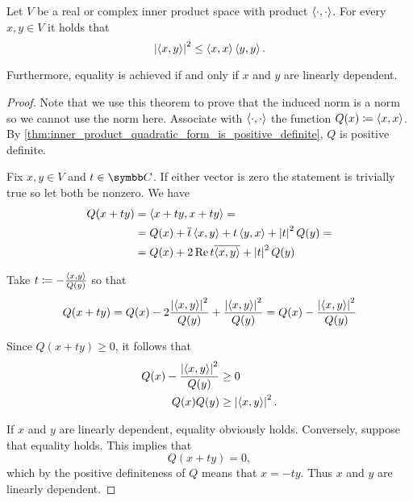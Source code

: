 \begin{theorem}\label{thm:cauchy_bunyakovsky_schwarz_inequality}
  Let \( V \) be a real or complex inner product space with product \( \left\langle \cdot, \cdot \right\rangle \). For every \( x, y \in V \) it holds that
  \begin{equation}\label{thm:cauchy_bunyakovsky_schwarz_inequality/inequality}
    {\left\vert \left\langle x, y \right\rangle \right\vert}^2 \leq \left\langle x, x \right\rangle \left\langle y, y \right\rangle.
  \end{equation}

  Furthermore, equality is achieved if and only if \( x \) and \( y \) are linearly dependent.
\end{theorem}
\begin{proof}
  Note that we use this theorem to prove that the induced norm is a norm so we cannot use the norm here. Associate with \( \left\langle \cdot, \cdot \right\rangle \) the function \( Q(x) \coloneqq \left\langle x, x \right\rangle \). By \cref{thm:inner_product_quadratic_form_is_positive_definite}, \( Q \) is positive definite.

  Fix \( x, y \in V \) and \( t \in \Co \). If either vector is zero the statement is trivially true so let both be nonzero. We have
  \begin{align*}
    Q(x + ty)
    &=
    \left\langle x + ty, x + ty \right\rangle
    = \\ &=
    Q(x) + \overline{t} \left\langle x, y \right\rangle + t \left\langle y, x \right\rangle + \left\vert t \right\vert^2 Q(y)
    = \\ &=
    Q(x) + 2\operatorname{Re} t \overline{\left\langle x, y \right\rangle} + \left\vert t \right\vert^2 Q(y)
  \end{align*}

  Take \( t \coloneqq - \frac {\left\langle x, y \right\rangle} {Q(y)} \) so that
  \begin{equation*}
    Q(x + ty)
    =
    Q(x) - 2 \frac {\left\vert \left\langle x, y \right\rangle \right\vert^2} {Q(y)} + \frac {\left\vert \left\langle x, y \right\rangle \right\vert^2} {Q(y)}
    =
    Q(x) - \frac {\left\vert \left\langle x, y \right\rangle \right\vert^2} {Q(y)}
  \end{equation*}

  Since \( Q(x + ty) \geq 0 \), it follows that
  \begin{align*}
    Q(x) - \frac {\left\vert \left\langle x, y \right\rangle \right\vert^2} {Q(y)} &\geq 0 \\
    Q(x) Q(y) &\geq \left\vert \left\langle x, y \right\rangle \right\vert^2.
  \end{align*}

  If \( x \) and \( y \) are linearly dependent, equality obviously holds. Conversely, suppose that equality holds. This implies that
  \begin{equation*}
    Q(x + ty) = 0,
  \end{equation*}
  which by the positive definiteness of \( Q \) means that \( x = -ty \). Thus \( x \) and \( y \) are linearly dependent.
\end{proof}

